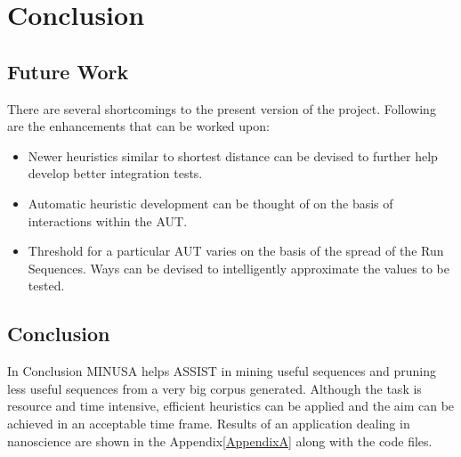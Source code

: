 
\chapter{Conclusion} %

\label{Chapter6} %



\section{Future Work}
There are several shortcomings to the present version of the project. Following are the enhancements that can be worked upon:

\begin{itemize}
\item Newer heuristics similar to shortest distance can be devised to further help develop better integration tests.
\item Automatic heuristic development can be thought of on the basis of interactions within the AUT.
\item Threshold for a particular AUT varies on the basis of the spread of the Run Sequences. Ways can be devised to intelligently approximate the values to be tested.
\end{itemize}

\section{Conclusion}

In Conclusion MINUSA helps ASSIST in mining useful sequences and pruning less useful sequences from a very big corpus generated. Although the task is resource and time intensive, efficient heuristics can be applied and the aim can be achieved in an acceptable time frame. Results of an application dealing in nanoscience are shown in the Appendix\ref{AppendixA} along with the code files.
